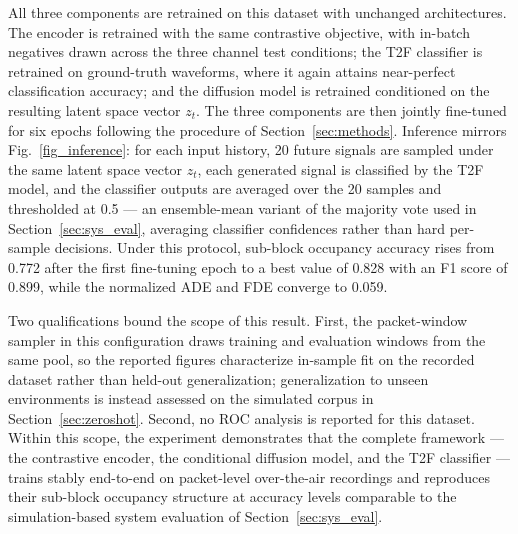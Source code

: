 \documentclass[lettersize,journal]{IEEEtran}
\begin{document}
All three components are retrained on this dataset with unchanged architectures. The encoder is retrained with the same contrastive objective, with in-batch negatives drawn across the three channel test conditions; the T2F classifier is retrained on ground-truth waveforms, where it again attains near-perfect classification accuracy; and the diffusion model is retrained conditioned on the resulting latent space vector $z_t$. The three components are then jointly fine-tuned for six epochs following the procedure of Section~\ref{sec:methods}. Inference mirrors Fig.~\ref{fig_inference}: for each input history, 20 future signals are sampled under the same latent space vector $z_t$, each generated signal is classified by the T2F model, and the classifier outputs are averaged over the 20 samples and thresholded at 0.5 — an ensemble-mean variant of the majority vote used in Section~\ref{sec:sys_eval}, averaging classifier confidences rather than hard per-sample decisions. Under this protocol, sub-block occupancy accuracy rises from 0.772 after the first fine-tuning epoch to a best value of 0.828 with an F1 score of 0.899, while the normalized ADE and FDE converge to 0.059.

Two qualifications bound the scope of this result. First, the packet-window sampler in this configuration draws training and evaluation windows from the same pool, so the reported figures characterize in-sample fit on the recorded dataset rather than held-out generalization; generalization to unseen environments is instead assessed on the simulated corpus in Section~\ref{sec:zeroshot}. Second, no ROC analysis is reported for this dataset. Within this scope, the experiment demonstrates that the complete framework — the contrastive encoder, the conditional diffusion model, and the T2F classifier — trains stably end-to-end on packet-level over-the-air recordings and reproduces their sub-block occupancy structure at accuracy levels comparable to the simulation-based system evaluation of Section~\ref{sec:sys_eval}.
\end{document}
